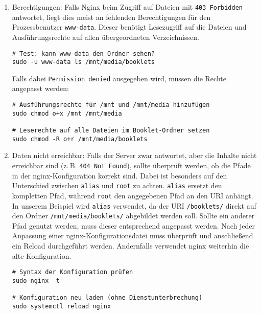 \documentclass[12pt,a4paper]{report}
\begin{document}
    \begin{enumerate}
      \item Berechtigungen:
      Falls Nginx beim Zugriff auf Dateien mit \texttt{403 Forbidden} antwortet, liegt dies meist an fehlenden Berechtigungen für den Prozessbenutzer \texttt{www-data}.  
      Dieser benötigt Lesezugriff auf die Dateien und Ausführungsrechte auf allen übergeordneten Verzeichnissen.

      \begin{verbatim}
# Test: kann www-data den Ordner sehen?
sudo -u www-data ls /mnt/media/booklets
      \end{verbatim}

      Falls dabei \texttt{Permission denied} ausgegeben wird, müssen die Rechte angepasst werden:

      \begin{verbatim}
# Ausführungsrechte für /mnt und /mnt/media hinzufügen
sudo chmod o+x /mnt /mnt/media

# Leserechte auf alle Dateien im Booklet-Ordner setzen
sudo chmod -R o+r /mnt/media/booklets
      \end{verbatim}

      \item Daten nicht erreichbar:
      Falls der Server zwar antwortet, aber die Inhalte nicht erreichbar sind (z.\,B. \texttt{404 Not Found}), 
      sollte überprüft werden, ob die Pfade in der nginx-Konfiguration korrekt sind.  
      Dabei ist besonders auf den Unterschied zwischen \texttt{alias} und \texttt{root} zu achten.  
      \texttt{alias} ersetzt den kompletten Pfad, während \texttt{root} den angegebenen Pfad an den URI anhängt.  
      In unserem Beispiel wird \texttt{alias} verwendet, da der URI \texttt{/booklets/} direkt auf den Ordner \texttt{/mnt/media/booklets/}
      abgebildet werden soll. Sollte ein anderer Pfad genutzt werden, muss dieser entsprechend angepasst werden.
      Nach jeder Anpassung einer nginx-Konfigurationsdatei muss überprüft und anschließend ein Reload durchgeführt werden.  
      Andernfalls verwendet nginx weiterhin die alte Konfiguration.

      \begin{verbatim}
# Syntax der Konfiguration prüfen
sudo nginx -t

# Konfiguration neu laden (ohne Dienstunterbrechung)
sudo systemctl reload nginx
      \end{verbatim}


\end{enumerate}
\end{document}
